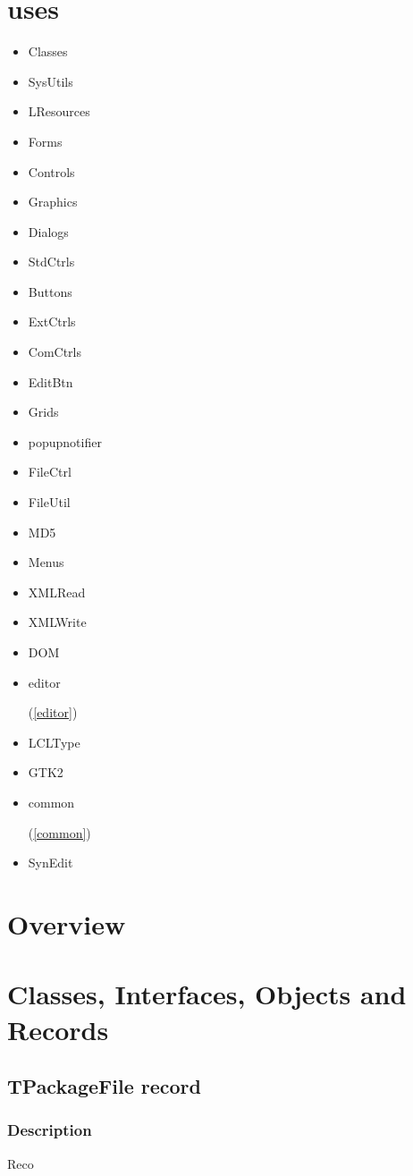 \documentclass{report}
\newif\ifpdf
\begin{document}
\section{uses}
\begin{itemize}
\item \begin{ttfamily}Classes\end{ttfamily}\item \begin{ttfamily}SysUtils\end{ttfamily}\item \begin{ttfamily}LResources\end{ttfamily}\item \begin{ttfamily}Forms\end{ttfamily}\item \begin{ttfamily}Controls\end{ttfamily}\item \begin{ttfamily}Graphics\end{ttfamily}\item \begin{ttfamily}Dialogs\end{ttfamily}\item \begin{ttfamily}StdCtrls\end{ttfamily}\item \begin{ttfamily}Buttons\end{ttfamily}\item \begin{ttfamily}ExtCtrls\end{ttfamily}\item \begin{ttfamily}ComCtrls\end{ttfamily}\item \begin{ttfamily}EditBtn\end{ttfamily}\item \begin{ttfamily}Grids\end{ttfamily}\item \begin{ttfamily}popupnotifier\end{ttfamily}\item \begin{ttfamily}FileCtrl\end{ttfamily}\item \begin{ttfamily}FileUtil\end{ttfamily}\item \begin{ttfamily}MD5\end{ttfamily}\item \begin{ttfamily}Menus\end{ttfamily}\item \begin{ttfamily}XMLRead\end{ttfamily}\item \begin{ttfamily}XMLWrite\end{ttfamily}\item \begin{ttfamily}DOM\end{ttfamily}\item \begin{ttfamily}editor\end{ttfamily}(\ref{editor})\item \begin{ttfamily}LCLType\end{ttfamily}\item \begin{ttfamily}GTK2\end{ttfamily}\item \begin{ttfamily}common\end{ttfamily}(\ref{common})\item \begin{ttfamily}SynEdit\end{ttfamily}\end{itemize}
\section{Overview}
\begin{description}
\item[\texttt{\begin{ttfamily}TPackageFile\end{ttfamily} record}]
\item[\texttt{\begin{ttfamily}TfrmProjectWizard\end{ttfamily} Class}]
\end{description}
\section{Classes, Interfaces, Objects and Records}
\ifpdf
\subsection*{\large{\textbf{TPackageFile record}}\normalsize\hspace{1ex}\hrulefill}
\else
\subsection*{TPackageFile record}
\fi
\label{prjwizard.TPackageFile}
\subsubsection*{\large{\textbf{Description}}\normalsize\hspace{1ex}\hfill}
Reco
\end{document}
